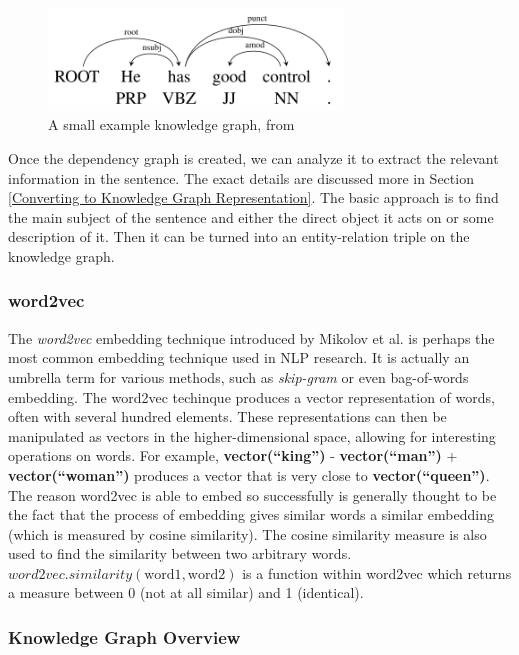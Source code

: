 \documentclass[pageno]{final_paper}
\begin{document}
\begin{figure}[!tb]
    \centering
    \includegraphics[width=0.7\textwidth,keepaspectratio]{figures/Dependency_Graph.png}
    \caption{A small example knowledge graph, from \cite{Chen2014}}
    \label{fig: dependency parsing}
\end{figure}

Once the dependency graph is created, we can analyze it to extract the relevant
information in the sentence. The exact details are discussed more in Section
\ref{Converting to Knowledge Graph Representation}. The basic approach is to
find the main subject of the sentence and either the direct object it acts on or
some description of it. Then it can be turned into an entity-relation triple on
the knowledge graph.

\subsubsection{word2vec}
\label{word2vec}

The \textit{word2vec} embedding technique introduced by Mikolov et al.
\cite{Mikolov2013} is perhaps the most common embedding technique used in NLP
research. It is actually an umbrella term for various methods, such as
\textit{skip-gram} or even bag-of-words embedding. The word2vec techinque
produces a vector representation of words, often with several hundred elements.
These representations can then be manipulated as vectors in the
higher-dimensional space, allowing for interesting operations on words. For
example, \textbf{vector(``king'')} - \textbf{vector(``man'')} +
\textbf{vector(``woman'')} produces a vector that is very close to
\textbf{vector(``queen'')}. The reason word2vec is able to embed so successfully
is generally thought to be the fact that the process of embedding gives similar
words a similar embedding (which is measured by cosine similarity). The cosine
similarity measure is also used to find the similarity between two arbitrary
words. $word2vec.similarity(\text{word1}, \text{word2})$ is a function within
word2vec which returns a measure between 0 (not at all similar) and 1
(identical).

\subsubsection{Knowledge Graph Overview}
\label{Knowledge Graph Overview}
\end{document}

